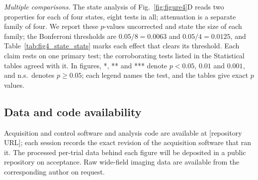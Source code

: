 \emph{Multiple comparisons.} The state analysis of Fig.~\ref{fig:figure4}D reads
two properties for each of four states, eight tests in all; attenuation is a
separate family of four. We report these $p$-values uncorrected and state the
size of each family; the Bonferroni thresholds are $0.05/8 = 0.0063$ and
$0.05/4 = 0.0125$, and Table~\ref{tab:fig4_state_stats} marks each effect that
clears its threshold. Each claim rests on one primary test; the corroborating
tests listed in the Statistical tables agreed with it. In figures, *, ** and *** denote $p < 0.05$, $0.01$ and $0.001$, and n.s.\ denotes $p \ge 0.05$; each legend names the test, and the tables give exact $p$ values.

\subsection*{Data and code availability}

Acquisition and control software and analysis code are available at
[repository URL]; each session records the exact revision of the acquisition
software that ran it. The processed per-trial data behind each figure will be
deposited in a public repository on acceptance. Raw wide-field imaging data are
available from the corresponding author on request.
